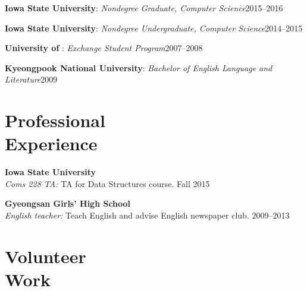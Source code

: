 \documentclass[margin,line]{resume}
\begin{document}
\begin{resume}
    \textbf{Iowa State University}:  %
    \textsl{Nondegree Graduate, Computer Science}\hfill 2015--2016

    \textbf{Iowa State University}:  %
    \textsl{Nondegree Undergraduate, Computer Science}\hfill 2014--2015
        
    \textbf{University of \Hawaii}: \textsl{Exchange Student Program}\hfill  2007--2008  
        
    \textbf{Kyeongpook National University}:  %
    \textsl{Bachelor of English Language and Literature}\hfill 2009



      
    \section{\mysidestyle Professional\\Experience}
    \textbf{Iowa State University}\\
    \textsl{Coms 228 TA:} TA for Data Structures course. \hfill Fall
    2015

    \textbf{Gyeongsan Girls' High School}\\
    \textsl{English teacher:} Teach English and advise English newspaper club.  \hfill 2009--2013





    
    \section{\mysidestyle Volunteer\\Work}


\end{resume}
\end{document}
